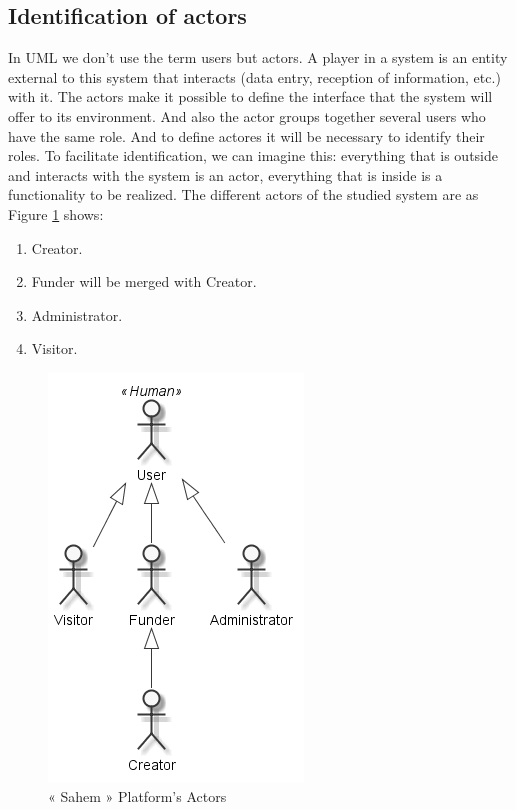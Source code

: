 \subsection{Identification of actors}
In UML we don't use the term users but actors. A player in a system is an entity external to this system that interacts (data entry, reception of information, etc.) with it. The actors make it possible to define the interface that the system will offer to its environment. And also the actor groups together several users who have the same role. And to define actores it will be necessary to identify their roles.
To facilitate identification, we can imagine this: everything that is outside and interacts with the system is an actor, everything that is inside is a functionality to be realized.
The different actors of the studied system are as Figure \ref{fig:Sahem actors} shows:

\begin{enumerate}
    \item  Creator.
    \item  Funder will be merged with Creator.
    \item  Administrator.
    \item  Visitor.
\end{enumerate}

\begin{figure}[!ht]
      \centering
      \includegraphics[scale=0.6]{assets/Actors.png}
      \caption{« Sahem » Platform's Actors}
      \label{fig:Sahem actors}
\end{figure}
